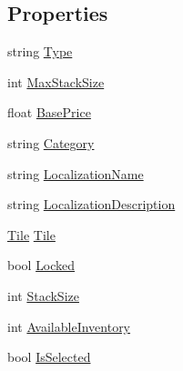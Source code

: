 \subsection*{Properties}
\begin{DoxyCompactItemize}
\item 
string \hyperlink{class_inventory_a6ce84e5edd07997e764ef8f0f3a047c5}{Type}
\item 
int \hyperlink{class_inventory_a27bd27b3ba5a7c396c6d8b7cc98c5df2}{Max\+Stack\+Size}
\item 
float \hyperlink{class_inventory_a3e9cedba92d689d70d765f25ca7f7830}{Base\+Price}
\item 
string \hyperlink{class_inventory_aafba8da2a679ce42d351fd071de24295}{Category}
\item 
string \hyperlink{class_inventory_ad99ffac71e181c38c31a48131b76e73d}{Localization\+Name}
\item 
string \hyperlink{class_inventory_aee8e3400bd94b3bb09417a778af3c354}{Localization\+Description}
\item 
\hyperlink{class_tile}{Tile} \hyperlink{class_inventory_a1b93a8cbc09713a7e2528c7800e915e9}{Tile}
\item 
bool \hyperlink{class_inventory_a93655f2c64f8b0bbe7e9d670c7d66e80}{Locked}
\item 
int \hyperlink{class_inventory_a92b3f098aafbca7a46e3204f4435112f}{Stack\+Size}
\item 
int \hyperlink{class_inventory_a5d26eb9165bd777a9d3f6e7428bd1047}{Available\+Inventory}
\item 
bool \hyperlink{class_inventory_a65c2afad578199c93e073d7a0c7c29ae}{Is\+Selected}
\end{DoxyCompactItemize}
